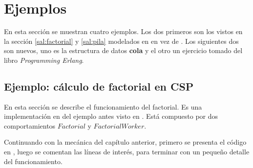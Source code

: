 \section{Ejemplos}

En esta sección se muestran cuatro ejemplos. Los dos primeros son los vistos en la sección \ref{sal:factorial} y \ref{sal:pila} modelados en \CSP en vez de \SAL. Los siguientes dos son nuevos, uno es la estructura de datos \textbf{cola} y el otro un ejercicio tomado del libro \textit{Programming Erlang}\cite{Cesarini:2009:EP:1717841}.

\subsection{Ejemplo: cálculo de factorial en CSP}
En esta sección se describe el funcionamiento del factorial. Es una implementación en \CSP del ejemplo antes visto en \SAL. Está compuesto por dos comportamientos $Factorial$ y $FactorialWorker$.

Continuando con la mecánica del capítulo anterior, primero se presenta el código en \CSP, luego se comentan las líneas de interés, para terminar con un pequeño detalle del funcionamiento.

